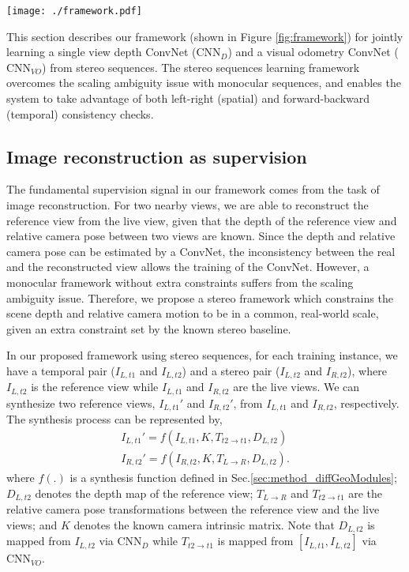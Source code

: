 \documentclass[10pt,twocolumn,letterpaper]{article}
\begin{document}
\begin{figure*}[h] 
\centering
    \texttt{[image: ./framework.pdf]}
    \caption{Illustration of our proposed framework in training phase. $\text{CNN}_{VO}$ and $\text{CNN}_D$ can be used independently in testing phase. }\label{fig:framework}
\end{figure*}

This section describes our framework (shown in Figure \ref{fig:framework}) for jointly learning a single view depth ConvNet ($\text{CNN}_{D}$) and a visual odometry ConvNet ($\text{CNN}_{VO}$) from stereo sequences. The stereo sequences learning framework overcomes the scaling ambiguity issue with monocular sequences, and enables the system to take advantage of both left-right (spatial) and forward-backward (temporal) consistency checks. 

\subsection{Image reconstruction as supervision} \label{sec:method_imgSuper}
The fundamental supervision signal in our framework comes from the task of image reconstruction. For two nearby views, we are able to reconstruct the reference view from the live view, given that the depth of the reference view and relative camera pose between two views are known. 
Since the depth and relative camera pose can be estimated by a ConvNet, the inconsistency between the real and the reconstructed view allows the training of the ConvNet. 
However, a monocular framework without extra constraints \cite{zhou2017sfmlearner} suffers from the scaling ambiguity issue. Therefore, we propose a stereo framework which constrains the scene depth and relative camera motion to be in a common, real-world scale, given an extra constraint set by the known stereo baseline.

In our proposed framework using stereo sequences, for each training instance, we have a temporal pair ($I_{L,t1}$ and $I_{L,t2}$) and a stereo pair ($I_{L,t2}$ and $I_{R,t2}$), where $I_{L,t2}$ is the reference view while $I_{L,t1}$ and $I_{R,t2}$ are the live views. We can synthesize two reference views, $I_{L,t1}'$ and $I_{R,t2}'$, from $I_{L,t1}$ and $I_{R,t2}$, respectively. The synthesis process can be represented by, 
% 
\begin{align}
    I_{L,t1}' = f(I_{L,t1}, K, T_{t2 \rightarrow t1}, D_{L,t2}) \label{eqn:synImg1} \\
    I_{R,t2}' = f(I_{R,t2}, K, T_{L \rightarrow R}, D_{L,t2}). \label{eqn:synImg2}
\end{align}
% 
\noindent where $f(.)$ is a synthesis function defined in Sec.\ref{sec:method_diffGeoModules}; 
$D_{L,t2}$ denotes the depth map of the reference view; 
$T_{L \rightarrow R}$ and $T_{t2 \rightarrow t1}$ are the relative camera pose transformations between the reference view and the live views; 
and $K$ denotes the known camera intrinsic matrix. Note that $D_{L,t2}$ is mapped from $I_{L,t2}$ via $\text{CNN}_{D}$ 
while $T_{t2 \rightarrow t1}$ is mapped from $[I_{L,t1}, I_{L,t2}]$ via $\text{CNN}_{VO}$. 
\end{document}
